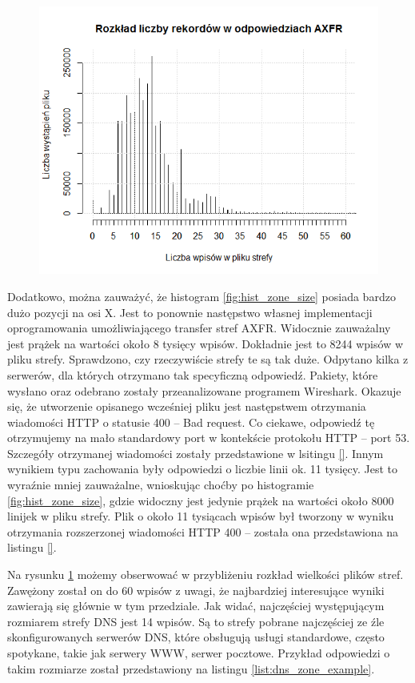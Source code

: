 \begin{figure}[ht]
\centering
\includegraphics[width=1.0\textwidth]{image/hist_zone_size_zoom}
\caption{}
\label{fig:hist_zone_size_zoom}
\end{figure}

Dodatkowo, można zauważyć, że histogram \ref{fig:hist_zone_size} posiada bardzo dużo pozycji na osi X. Jest to ponownie następstwo własnej implementacji oprogramowania umożliwiającego transfer stref AXFR. Widocznie zauważalny jest prążek na wartości około 8 tysięcy wpisów. Dokładnie jest to 8244 wpisów w pliku strefy. Sprawdzono, czy rzeczywiście strefy te są tak duże. Odpytano kilka z serwerów, dla których otrzymano tak specyficzną odpowiedź. Pakiety, które wysłano oraz odebrano zostały przeanalizowane programem Wireshark. Okazuje się, że utworzenie opisanego wcześniej pliku jest następstwem otrzymania wiadomości HTTP o statusie 400 -- Bad request. Co ciekawe, odpowiedź tę otrzymujemy na mało standardowy port w kontekście protokołu HTTP -- port 53. Szczegóły otrzymanej wiadomości zostały przedstawione w lsitingu \ref{}. Innym wynikiem typu zachowania były odpowiedzi o liczbie linii ok. 11 tysięcy. Jest to wyraźnie mniej zauważalne, wnioskując choćby po histogramie \ref{fig:hist_zone_size}, gdzie widoczny jest jedynie prążek na wartości około 8000 linijek w pliku strefy. Plik o około 11 tysiącach wpisów był tworzony w wyniku otrzymania rozszerzonej wiadomości HTTP 400 -- została ona przedstawiona na listingu \ref{}.

Na rysunku \ref{fig:hist_zone_size_zoom} możemy obserwować w przybliżeniu rozkład wielkości plików stref. Zawężony został on do 60 wpisów z uwagi, że najbardziej interesujące wyniki zawierają się głównie w tym przedziale. Jak widać, najczęściej występującym rozmiarem strefy DNS jest 14 wpisów. Są to strefy pobrane najczęściej ze źle skonfigurowanych serwerów DNS, które obsługują usługi standardowe, często spotykane, takie jak serwery WWW, serwer pocztowe. Przykład odpowiedzi o takim rozmiarze został przedstawiony na listingu \ref{list:dns_zone_example}.  

